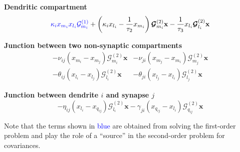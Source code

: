 \documentclass[a4paper, 11pt]{article}
\begin{document}
              {\bf Dendritic compartment}
              \begin{equation*}
                \textcolor{blue}{\kappa_ix_{m_i}x_{l_i}\mathcal G^{(1)}_{m_i}} + \left(\kappa_ix_{l_i} - \frac{1}{\tau_2}x_{m_i}\right)\boldsymbol{\mathcal G}^{(2)}_{m_i}\mathbf x - \frac{1}{\tau_3}x_{l_i}\boldsymbol{\mathcal G}^{(2)}_{l_i}\mathbf x
              \end{equation*}

              {\bf Junction between two non-synaptic compartments}
              \begin{align*}
                -\nu_{ij}\left(x_{m_i} - x_{m_j}\right)\boldsymbol{\mathcal G}_{m_i}^{(2)}\mathbf x& - \nu_{ji}\left(x_{m_j} - x_{m_i}\right)\boldsymbol{\mathcal G}_{m_j}^{(2)}\mathbf x\\
                - \theta_{ij}\left(x_{l_i}-x_{l_j}\right)\boldsymbol{\mathcal G}_{l_i}^{(2)}\mathbf x& - \theta_{ji}\left(x_{l_j} - x_{l_i}\right)\boldsymbol{\mathcal G}^{(2)}_{l_j}\mathbf x
              \end{align*}

              {\bf Junction between dendrite $i$ and synapse $j$}
              \begin{equation*}
                -\eta_{ij}\left(x_{l_i}-x_{q_{ij}}\right)\boldsymbol{\mathcal G}^{(2)}_{l_i}\mathbf x - \gamma_{ji}\left(x_{q_{ij}}-x_{l_i}\right)\boldsymbol{\mathcal G}^{(2)}_{q_{ij}}\mathbf x
              \end{equation*}

              Note that the terms shown in \textcolor{blue}{blue} are obtained from solving the first-order problem and play the role of a ``source'' in the second-order problem for covariances.

              
\end{document}
